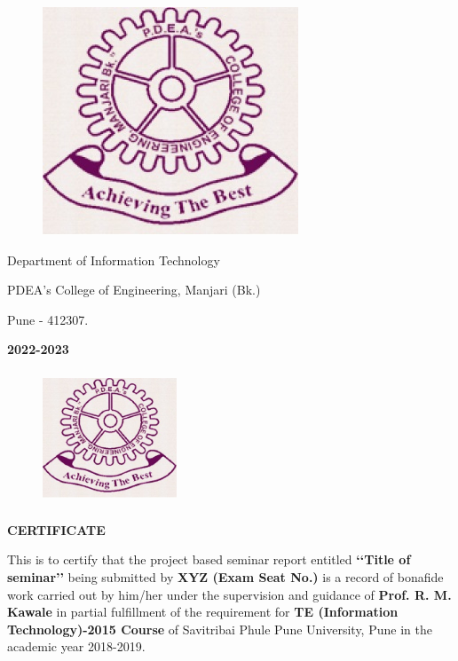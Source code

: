 \documentclass[11pt,a4paper]{article}
\begin{document}
\begin{center}
\begin{figure}[h]
			\centering
			\includegraphics[width=2.5 cm]{COEMlogo}
\end{figure}
\end{center}
	
\begin{center}Department of Information Technology
\end{center}

\begin{center} \large {PDEA's College of Engineering, Manjari (Bk.)}
\end{center}

\begin{center}Pune - 412307.\textbf{ }
\end{center}


\begin{center}\textbf{\large{2022-2023}}
\end{center}
\newpage
\pagestyle{empty}

\begin{figure}[h]
\centering
\includegraphics[width=4cm,height=4cm]{COEMLogo.jpg}
\end{figure}

\begin{center}
\textbf{\Large{CERTIFICATE}}
\end{center}

\textsf{This is to certify that the project based seminar report entitled \textbf{\lq \lq Title of seminar\rq \rq} being submitted by \textbf{XYZ (Exam Seat No.)} is a record of bonafide work carried out by him/her under the supervision and guidance of \textbf{Prof. R. M. Kawale} in partial fulfillment of the requirement for \textbf{TE (Information Technology)-2015  Course} of Savitribai Phule Pune University, Pune in the academic year 2018-2019.}
\end{document}
